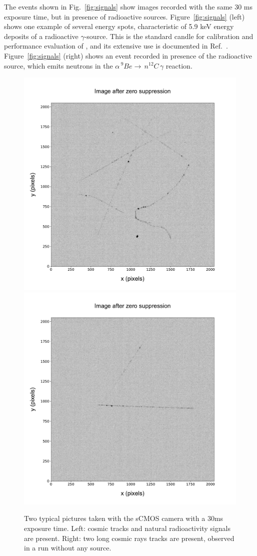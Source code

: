 \documentclass[12pt]{iopart}
\begin{document}
The events shown in Fig.~\ref{fig:signals} show images recorded with
the same 30 ms exposure time, but in presence of radioactive
sources. Figure~\ref{fig:signals} (left) shows one example of several
energy spots, characteristic of 5.9 keV energy deposits of a  \fe
radioactive $\gamma$-source.  This is the standard candle for calibration and
performance evaluation of \lemon, and its extensive use is documented in
Ref.~\cite{bib:fe55}. Figure~\ref{fig:signals} (right) shows an event
recorded in presence of the \ambe radioactive source, which emits neutrons in the 
$\alpha \, ^{9}Be \rightarrow \, n ^{12}C  \, \gamma$ reaction. 

 
\begin{figure}[ht]
  \begin{center}
    \includegraphics[width=0.49\linewidth]{figures/pic_run02317_ev8_oriIma_paper}
    \includegraphics[width=0.49\linewidth]{figures/pic_run02156_ev527_oriIma_paper}
    \caption{Two typical pictures taken with the sCMOS camera with a
      30\unit{ms} exposure time. Left: cosmic tracks and natural
      radioactivity signals are present. Right: two long cosmic rays
      tracks are present, observed in a run without any source.
      \label{fig:typicalimage1}}
  \end{center}
\end{figure}
\end{document}

